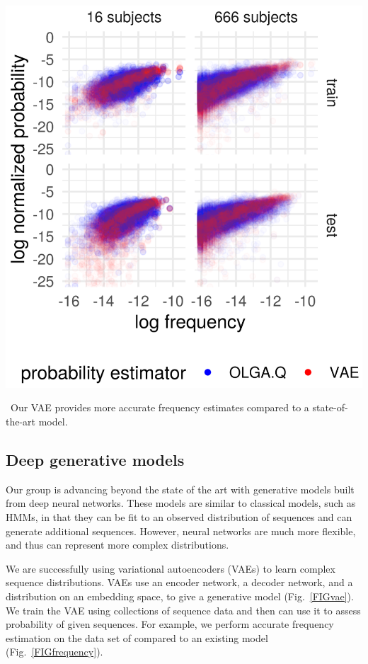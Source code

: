 \documentclass[nobib]{tufte-handout}
\begin{document}
\begin{marginfigure}[0.2in]%
\begin{centering}
    \includegraphics[width=\textwidth]{log_normed_Ppost_vs_log_normed_Pvae.png}
\end{centering}
  \caption{\
    Our VAE provides more accurate frequency estimates compared to a state-of-the-art model.
    }
  \label{FIGfrequency}
\end{marginfigure}%


\subsection*{Deep generative models}
Our group is advancing beyond the state of the art with generative models built from deep neural networks.
These models are similar to classical models, such as HMMs, in that they can be fit to an observed distribution of sequences and can generate additional sequences.
However, neural networks are much more flexible, and thus can represent more complex distributions.


We are successfully using variational autoencoders (VAEs) \cite{Kingma2014-mo} to learn complex sequence distributions.
VAEs use an encoder network, a decoder network, and a distribution on an embedding space, to give a generative model (Fig.~\ref{FIGvae}).
We train the VAE using collections of sequence data and then can use it to assess probability of given sequences.
For example, we perform accurate frequency estimation on the data set of \cite{Emerson2017-co} compared to an existing model (Fig.~\ref{FIGfrequency}).
\end{document}
